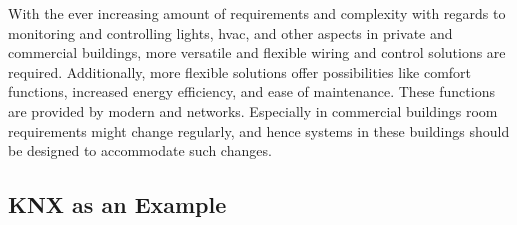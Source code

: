 
\label{sec:background:bas:intro}

With the ever increasing amount of requirements and complexity with regards to monitoring and controlling lights, \gls{hvac}, and other aspects in private and commercial buildings, more versatile and flexible wiring and control solutions are required. 
Additionally, more flexible solutions offer possibilities like comfort functions, increased energy efficiency, and ease of maintenance. \parencite{Merz2009}
These functions are provided by modern  and networks.
Especially in commercial buildings room requirements might change regularly, and hence systems in these buildings should be designed to accommodate such changes. \parencite{Merz2009} 

\subsection{KNX as an Example}
\label{sec:background:bas:knx}

